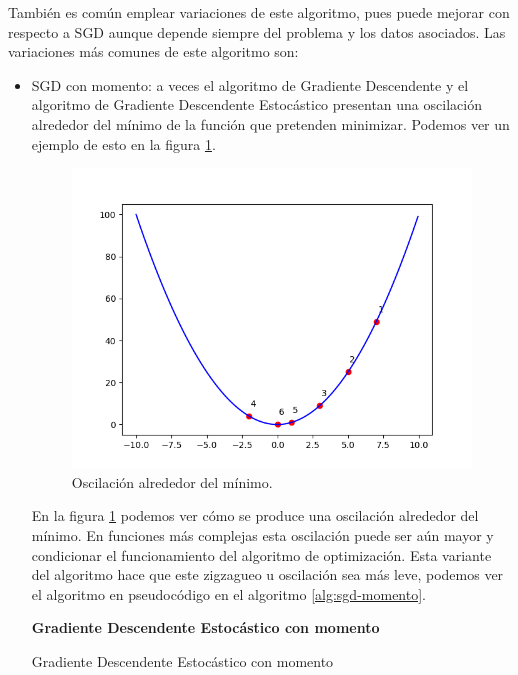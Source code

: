 También es común emplear variaciones de este algoritmo, pues puede mejorar con respecto a SGD aunque depende siempre del problema y los datos asociados. Las variaciones más comunes de este algoritmo son:

\begin{itemize}
	\item SGD con momento: a veces el algoritmo de Gradiente Descendente y el algoritmo de Gradiente Descendente Estocástico presentan una oscilación alrededor del mínimo de la función que pretenden minimizar. Podemos ver un ejemplo de esto en la figura \ref{img:oscilacion-sgd}.
	
	\begin{figure}[]
		\centering
		\includegraphics[scale=0.7]{imagenes/sgd.png}
		\caption{Oscilación alrededor del mínimo.}
		\label{img:oscilacion-sgd}
	\end{figure}

	En la figura \ref{img:oscilacion-sgd} podemos ver cómo se produce una oscilación alrededor del mínimo. En funciones más complejas esta oscilación puede ser aún mayor y condicionar el funcionamiento del algoritmo de optimización. Esta variante del algoritmo hace que este zigzagueo u oscilación sea más leve, podemos ver el algoritmo en pseudocódigo en el algoritmo \ref{alg:sgd-momento}.
	
	\begin{algorithm}[]{\Large{\textbf{Gradiente Descendente Estocástico con momento}}}
		
		\vspace{15px}
		
		\caption{Gradiente Descendente Estocástico con momento}
		\label{alg:sgd-momento}
		

\end{algorithm}
\end{itemize}
